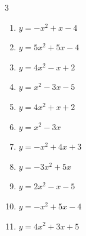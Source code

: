 \begin{multicols}{3}
\begin{enumerate}
\resetques

  \item $\displaystyle y=-x^{2}+x-4$


  \item $\displaystyle y=5x^{2}+5x-4$


  \item $\displaystyle y=4x^{2}-x+2$


  \item $\displaystyle y=x^{2}-3x-5$


  \item $\displaystyle y=4x^{2}+x+2$


\columnbreak %

  \item $\displaystyle y=x^{2}-3x$


  \item $\displaystyle y=-x^{2}+4x+3$

        \phantom{$\displaystyle 頂点\left( 2 , 7 \right)$}

  \item $\displaystyle y=-3x^{2}+5x$


  \item $\displaystyle y=2x^{2}-x-5$


  \item $\displaystyle y=-x^{2}+5x-4$


\columnbreak %

  \item $\displaystyle y=4x^{2}+3x+5$


\end{enumerate}
\end{multicols}
